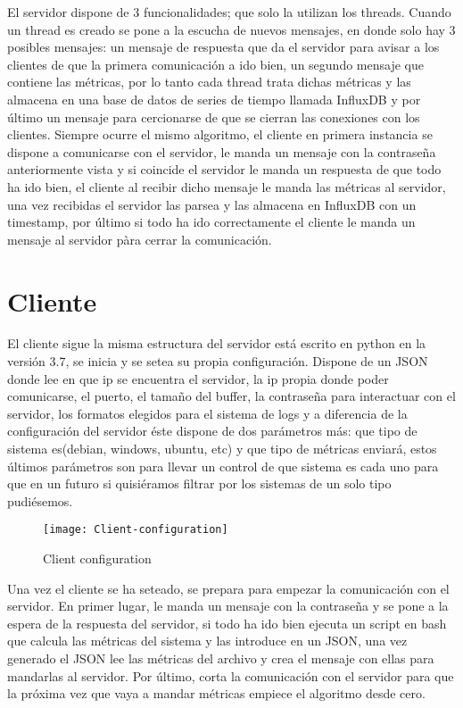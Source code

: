 \documentclass[ spanish, a4paper, 12pt, oneside]{report}
\begin{document}
El servidor dispone de 3 funcionalidades; que solo la utilizan los threads. Cuando un thread es creado se pone a la escucha de nuevos mensajes, en donde solo hay 3 posibles mensajes: un mensaje 
de respuesta que da el servidor para avisar a los clientes de que la primera comunicación a ido bien, un segundo mensaje que contiene las métricas, por lo tanto cada thread trata dichas métricas 
y las almacena en una base de datos de series de tiempo llamada InfluxDB y por último un mensaje para cercionarse de que se cierran las conexiones con los clientes. Siempre ocurre el mismo algoritmo, 
el cliente en primera instancia se dispone a comunicarse con el servidor, le manda un mensaje con la contraseña anteriormente vista y si coincide el servidor le manda un respuesta de que todo ha ido 
bien, el cliente al recibir dicho mensaje le manda las métricas al servidor, una vez recibidas el servidor las parsea y las almacena en InfluxDB con un timestamp, por último si todo ha ido correctamente 
el cliente le manda un mensaje al servidor pàra cerrar la comunicación. \\ 


\section{Cliente}
El cliente sigue la misma estructura del servidor está escrito en python en la versión 3.7, se inicia y se setea su propia configuración. Dispone de un JSON donde lee en que ip se encuentra el servidor, la ip propia donde poder comunicarse, el puerto, 
el tamaño del buffer, la contraseña para interactuar con el servidor, los formatos elegidos para el sistema de logs y a diferencia de la configuración del servidor éste dispone de dos parámetros más: que tipo 
de sistema es(debian, windows, ubuntu, etc) y que tipo de métricas enviará, estos últimos parámetros son para llevar un control de que sistema es cada uno para que en un futuro si quisiéramos filtrar por los sistemas 
de un solo tipo pudiésemos. \\

\begin{figure}[!h]
   \centering
   \texttt{[image: Client-configuration]}\\
      \caption{\label{fig: Client configuration} Client configuration}
\end{figure}

Una vez el cliente se ha seteado, se prepara para empezar la comunicación con el servidor. En primer lugar, le manda un mensaje con la contraseña y se pone a la espera de la respuesta del servidor, si todo ha ido bien 
ejecuta un script en bash que calcula las métricas del sistema y las introduce en un JSON, una vez generado el JSON lee las métricas del archivo y crea el mensaje con ellas para mandarlas al servidor. Por último, corta la comunicación 
con el servidor para que la próxima vez que vaya a mandar métricas empiece el algoritmo desde cero. \\
\end{document}

